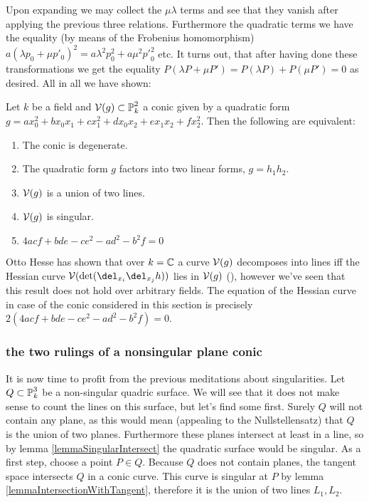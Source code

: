 Upon expanding we may collect the $\mu\lambda$ terms and see that they vanish after applying the previous three relations.
Furthermore the quadratic terms we have the equality (by means of the Frobenius homomorphism)
$a(\lambda p_0 + \mu p'_0)^2 = a\lambda^2p_0^2 + a \mu^2 {p'}_0^2$ etc.
It turns out, that after having done these transformations we get the equality $P(\lambda P + \mu P') = P(\lambda P) + P(\mu P') = 0$ as desired.
All in all we have shown:

\begin{theorem}
Let $k$ be a field and $\operatorname{\mathcal V}(g) \subset \operatorname{\mathbb P}^2_k$ a conic given by a quadratic form $g = ax_0^2 + bx_0x_1 + cx_1^2 + dx_0x_2 + ex_1x_2 + fx_2^2$.
Then the following are equivalent:
\begin{enumerate}
\item The conic is degenerate.
\item The quadratic form $g$ factors into two linear forms, $g=h_1h_2$.
\item $\operatorname{\mathcal V}(g)$ is a union of two lines.
\item $\operatorname{\mathcal V}(g)$ is singular.
\item $4acf + bde - ce^2 - ad^2 - b^2f = 0$
\end{enumerate}
\end{theorem}


\begin{remark}
Otto Hesse has shown that over $k=\operatorname{\mathbb C}$ a curve $\operatorname{\mathcal V}(g)$ decomposes into lines iff the Hessian curve $\V(\det(\del_{x_i}\del_{x_j}h))$ lies in $\operatorname{\mathcal V}(g)$ (\cite[p.289]{brieskorn2012plane}), however we've seen that this result does not hold over arbitrary fields.
The equation of the Hessian curve in case of the conic considered in this section is precisely $2(4acf + bde - ce^2 - ad^2 - b^2f) = 0$.
\end{remark}


\subsubsection{the two rulings of a nonsingular plane conic}


It is now time to profit from the previous meditations about singularities.
Let $Q \subset \operatorname{\mathbb P}^3_k$ be a non-singular quadric surface.
We will see that it does not make sense to count the lines on this surface, but let's find some first.
Surely $Q$ will not contain any plane, as this would mean (appealing to the Nullstellensatz) that $Q$ is the union of two planes.
Furthermore these planes intersect at least in a line, so by lemma \ref{lemmaSingularIntersect} the quadratic surface would be singular.
As a first step, choose a point $P \in Q$.
Because $Q$ does not contain planes, the tangent space intersects $Q$ in a conic curve.
This curve is singular at $P$ by lemma \ref{lemmaIntersectionWithTangent}, therefore it is the union of two lines $L_1,L_2$.

